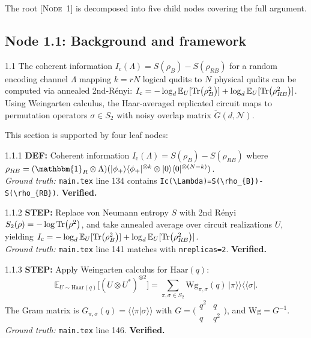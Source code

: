 \documentclass[11pt,a4paper]{article}
\newcommand{\Ic}{I_{\mathrm{c}}}
\newcommand{\Wg}{\mathrm{Wg}}
\newcommand{\Noise}{\mathcal{N}}
\newcommand{\Ex}{\mathbb{E}}
\newcommand{\noderef}[1]{\textsc{[Node~#1]}}
\begin{document}
The root \noderef{1} is decomposed into five child nodes covering the full argument.

\subsection{Node 1.1: Background and framework}
\label{sec:node11}

\begin{proofnode}{1.1}
The coherent information $\Ic(\Lambda) = S(\rho_B) - S(\rho_{RB})$ for a random encoding channel $\Lambda$ mapping $k=rN$ logical qudits to $N$ physical qudits can be computed via annealed 2nd-R\'enyi: $\Ic = -\log_d \Ex_U[\Tr(\rho_B^2)] + \log_d \Ex_U[\Tr(\rho_{RB}^2)]$. Using Weingarten calculus, the Haar-averaged replicated circuit maps to permutation operators $\sigma \in S_2$ with noisy overlap matrix $\tilde{G}(d,\Noise)$.
\end{proofnode}

This section is supported by four leaf nodes:

\begin{proofnode}{1.1.1}
\textbf{DEF:} Coherent information $\Ic(\Lambda) = S(\rho_B) - S(\rho_{RB})$ where $\rho_{RB} = (\mathbbm{1}_R \otimes \Lambda)(|\phi_+\rangle\langle\phi_+|^{\otimes k} \otimes |0\rangle\langle 0|^{\otimes(N-k)})$.\\
\textit{Ground truth:} \texttt{main.tex} line 134 contains \texttt{Ic(\textbackslash Lambda)=S(\textbackslash rho\_\{B\})-S(\textbackslash rho\_\{RB\})}. \textbf{Verified.}
\end{proofnode}

\begin{proofnode}{1.1.2}
\textbf{STEP:} Replace von Neumann entropy $S$ with 2nd R\'enyi $S_2(\rho) = -\log \Tr(\rho^2)$, and take annealed average over circuit realizations $U$, yielding $\Ic = -\log_d \Ex_U[\Tr(\rho_B^2)] + \log_d \Ex_U[\Tr(\rho_{RB}^2)]$.\\
\textit{Ground truth:} \texttt{main.tex} line 141 matches with \texttt{nreplicas=2}. \textbf{Verified.}
\end{proofnode}

\begin{proofnode}{1.1.3}
\textbf{STEP:} Apply Weingarten calculus for $\mathrm{Haar}(q)$:
\begin{equation}
    \Ex_{U \sim \mathrm{Haar}(q)}\bigl[(U \otimes U^*)^{\otimes 2}\bigr] = \sum_{\pi,\sigma \in S_2} \Wg_{\pi,\sigma}(q)\,|\pi\rangle\!\rangle\langle\!\langle\sigma|.
    \label{eq:weingarten}
\end{equation}
The Gram matrix is $G_{\pi,\sigma}(q) = \langle\!\langle\pi|\sigma\rangle\!\rangle$ with $G = \bigl(\begin{smallmatrix} q^2 & q \\ q & q^2 \end{smallmatrix}\bigr)$, and $\Wg = G^{-1}$.\\
\textit{Ground truth:} \texttt{main.tex} line 146. \textbf{Verified.}
\end{proofnode}
\end{document}
